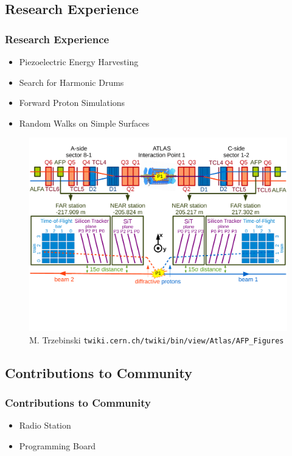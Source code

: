 \documentclass{beamer}
\begin{document}

\subsection{Research Experience}

\begin{frame}
\frametitle{Research Experience}

\begin{itemize}
	\item Piezoelectric Energy Harvesting
	\item Search for Harmonic Drums
	\item Forward Proton Simulations
	\item Random Walks on Simple Surfaces
\end{itemize}

\begin{figure}
	\includegraphics[width=0.7\linewidth]{images/afp_general_scheme.pdf}
	\caption{M. Trzebinski \texttt{twiki.cern.ch/twiki/bin/view/Atlas/AFP\_Figures} }
\end{figure}

\end{frame}


\subsection{Contributions to Community}

\begin{frame}
\frametitle{Contributions to Community}

\begin{itemize}
	\item Radio Station
	\item Programming Board
\end{itemize}

\end{frame}
\end{document}
